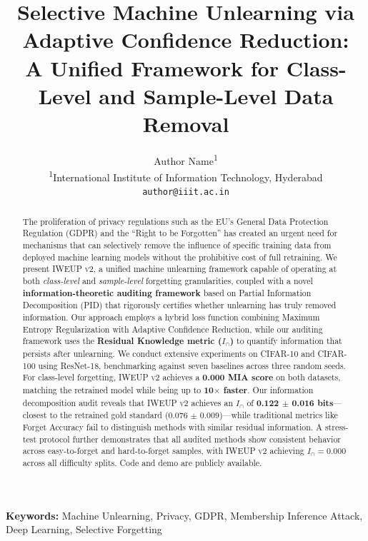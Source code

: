 \documentclass[11pt]{article}
\title{Selective Machine Unlearning via Adaptive Confidence Reduction:\\
A Unified Framework for Class-Level and Sample-Level Data Removal}
\author{
  Author Name\textsuperscript{1} \\
  \textsuperscript{1}International Institute of Information Technology, Hyderabad \\
  \texttt{author@iiit.ac.in}
}
\date{}
\newcommand{\method}{\textsc{IWEUP v2}}
\begin{document}
\maketitle

\begin{abstract}
The proliferation of privacy regulations such as the EU's General Data Protection Regulation (GDPR) and the ``Right to be Forgotten'' has created an urgent need for mechanisms that can selectively remove the influence of specific training data from deployed machine learning models without the prohibitive cost of full retraining.
We present \method{}, a unified machine unlearning framework capable of operating at both \textit{class-level} and \textit{sample-level} forgetting granularities, coupled with a novel \textbf{information-theoretic auditing framework} based on Partial Information Decomposition (PID) that rigorously certifies whether unlearning has truly removed information.
Our approach employs a hybrid loss function combining Maximum Entropy Regularization with Adaptive Confidence Reduction, while our auditing framework uses the \textbf{Residual Knowledge metric ($I_\cap$)} to quantify information that persists after unlearning.
We conduct extensive experiments on CIFAR-10 and CIFAR-100 using ResNet-18, benchmarking against seven baselines across three random seeds.
For class-level forgetting, \method{} achieves a \textbf{0.000 MIA score} on both datasets, matching the retrained model while being up to \textbf{10$\times$ faster}.
Our information decomposition audit reveals that \method{} achieves an $I_\cap$ of \textbf{0.122 $\pm$ 0.016 bits}---closest to the retrained gold standard (0.076 $\pm$ 0.009)---while traditional metrics like Forget Accuracy fail to distinguish methods with similar residual information.
A stress-test protocol further demonstrates that all audited methods show consistent behavior across easy-to-forget and hard-to-forget samples, with \method{} achieving $I_\cap = 0.000$ across all difficulty splits.
Code and demo are publicly available.
\end{abstract}

\noindent\textbf{Keywords:} Machine Unlearning, Privacy, GDPR, Membership Inference Attack, Deep Learning, Selective Forgetting

\end{document}
